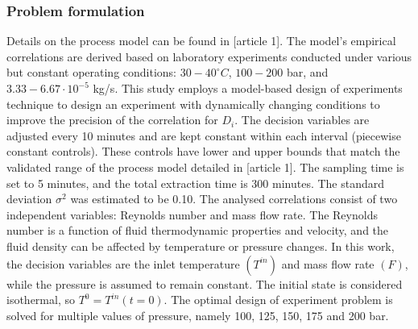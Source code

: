 \documentclass[../Article_Design_of_Experiment.tex]{subfiles}
\begin{document}
	\subsubsection{Problem formulation}
	
	Details on the process model can be found in [article 1]. The model's empirical correlations are derived based on laboratory experiments conducted under various but constant operating conditions: $30 - 40^\circ C$, $100 - 200$ bar, and $3.33-6.67 \cdot 10^{-5}$ kg/s. This study employs a model-based design of experiments technique to design an experiment with dynamically changing conditions to improve the precision of the correlation for $D_i$. The decision variables are adjusted every 10 minutes and are kept constant within each interval (piecewise constant controls). These controls have lower and upper bounds that match the validated range of the process model detailed in [article 1]. The sampling time is set to 5 minutes, and the total extraction time is 300 minutes. The standard deviation $\sigma^2$ was estimated to be 0.10. The analysed correlations consist of two independent variables: Reynolds number and mass flow rate. The Reynolds number is a function of fluid thermodynamic properties and velocity, and the fluid density can be affected by temperature or pressure changes. In this work, the decision variables are the inlet temperature $(T^{in})$ and mass flow rate $(F)$, while the pressure is assumed to remain constant. The initial state is considered isothermal, so $T^0 = T^{in}(t=0)$. The optimal design of experiment problem is solved for multiple values of pressure, namely 100, 125, 150, 175 and 200 bar. %
	
	\begin{comment}
	
	{\footnotesize
	\begin{equation}
		\begin{aligned} 
			&\Xi^* &= \arg &\min_{ T^{in}, F \in \Xi} \int_{t_0}^{t_f} - \ln j_D(\Xi,\dot{x}) dt  \\
			&\text{subject to}
			& \dot{x} &= G(x,t,\Theta;\Xi) \\
			&& t_0&=0\quad~\text{min} \\
			&& t_f&=300~\text{min} \\
			&& T^{0} &= T^{in}(t=0) \\
			&& P(t) & \in \{100, 125, 150, 175, 200\}~\text{bar} \\
			&& 30^\circ C \leq &T^{in}(t) \leq 40^\circ C \\
			&& 3.33 \cdot 10^{-5} \leq &F(t) \leq 6.67 \cdot 10^{-5}
		\end{aligned} \label{EQ:Formulation_1}
	\end{equation} } 

	\end{comment}
\end{document}
